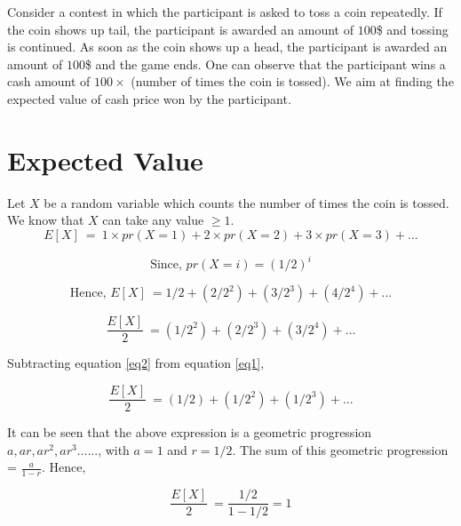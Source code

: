 \documentclass{book}
\begin{document}
Consider a contest in which the participant is asked to toss a coin repeatedly. If the coin shows up tail, the participant is awarded an amount of $100$\$ and tossing is continued. As soon as the coin shows up a head, the participant is awarded an amount of $100$\$ and the game ends. One can observe that the participant wins a cash amount of $100 \times$ (number of times the coin is tossed). We aim at finding the expected value of cash price won by the participant.

\section{Expected Value}
Let $X$ be a random variable which counts the number of times the coin is tossed.
We know that $X$ can take any value $\geq 1$.
\begin{equation}
E[X]\ =\ 1 \times pr(X=1) + 2 \times pr(X=2) + 3 \times pr(X=3)+ ... 
\end{equation}

\begin{equation}
\text{Since, } pr(X=i)  = (1/2)^i 
\end{equation}



\begin{equation}\label{eq1}
 \text{Hence, }E[X]\ = 1/2+(2/2^2)+(3/2^3)+(4/2^4)+...
\end{equation}

\begin{equation}\label{eq2}
 \frac{E[X]}{2}\ = (1/2^2)+(2/2^3)+(3/2^4)+...
\end{equation}


\begin{center}
Subtracting equation \ref{eq2} from equation \ref{eq1},
\end{center}

\begin{equation}\label{eq3}
 \frac{E[X]}{2}\ = (1/2)+(1/2^2)+(1/2^3)+...
\end{equation}


It can be seen that the above expression is a geometric progression $a,ar,ar^2,ar^3......$, with $a=1$ and $r=1/2$. The sum of this geometric progression = $\frac{a}{1-r}$. Hence,

\begin{equation}\label{eq4}
 \frac{E[X]}{2}\ = \frac{1/2}{1-1/2} = 1
\end{equation}

\begin{center}
\end{center}
\end{document}

